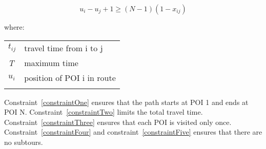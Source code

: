 \begin{equation} 
    \label{constraintFive}
    u_i - u_j + 1 \geq (N-1)(1-x_{ij})
\end{equation}

where:

\begin{tabular}{l l}
\textit{$t_{ij}$} & travel time from i to j \\
\textit{T} & maximum time \\
\textit{$u_i$} & position of POI i in route\\

               & \\

\end{tabular}


Constraint~\ref{constraintOne} ensures that the path starts at POI 1 and ends at POI N.
Constraint~\ref{constraintTwo} limits the total travel time.
Constraint~\ref{constraintThree} ensures that each POI is visited only once.
Constraint~\ref{constraintFour} and constraint~\ref{constraintFive} ensures that there are no subtours.
\\
